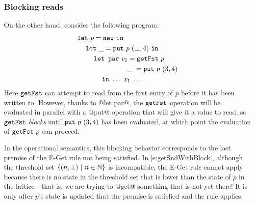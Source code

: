 \subsubsection{Blocking reads}

On the other hand, consider the following program:
\begin{equation}
\begin{split}
& \letexp{p}{\NEW}{ \\
& \letspace \letexp{\_}{\putexp{p}{(\bot,4)}}{ \\
& \letspace \letspace \LETPAR ~v_1 = \getfstexp{p} \\
& \letspace \letspace \letparspace \hspace{0.62em}\_~= \putexp{p}{(3,4)} \\
& \letspace \letspace \letspace \IN~ \dots~v_1~\dots }}
\end{split}
\label{e:getSndWithBlock}
\end{equation}
Here $\mbox{\texttt{getFst}}$ can attempt to read from the first entry of $p$ before
it has been written to.  However, thanks to @let par@, the $\mbox{\texttt{getFst}}$
operation will be evaluated in parallel with a @put@ operation that
will give it a value to read, so $\mbox{\texttt{getFst}}$ \emph{blocks} until
$\mbox{\texttt{put}}~p~(3,4)$ has been evaluated, at which point the evaluation
of $\mbox{\texttt{getFst}}~p$ can proceed.

In the operational semantics, this blocking behavior corresponds to
the last premise of the {\sc E-Get} rule not being satisfied.  In
\eqref{e:getSndWithBlock}, although the threshold set $\lbrace (n,
  \bot) \ | \  n \in \mathbb{N} \rbrace$ is incompatible, the {\sc E-Get}
rule cannot apply because there is no state in the threshold set that
is lower than the state of $p$ in the lattice---that is, we are trying
to @get@ something that is not yet there!  It is only after $p$'s
state is updated that the premise is satisfied and the rule applies.
